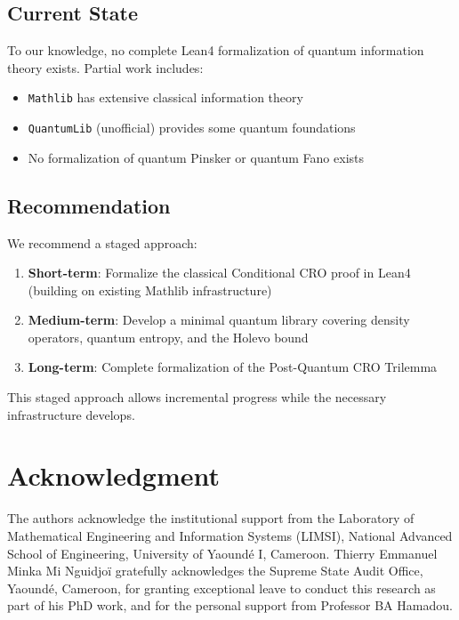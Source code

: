\documentclass{ieeeaccess}
\begin{document}
\subsection{Current State}

To our knowledge, no complete Lean4 formalization of quantum information theory exists. Partial work includes:
\begin{itemize}
    \item \texttt{Mathlib} has extensive classical information theory
    \item \texttt{QuantumLib} (unofficial) provides some quantum foundations
    \item No formalization of quantum Pinsker or quantum Fano exists
\end{itemize}

\subsection{Recommendation}

We recommend a staged approach:

\begin{enumerate}
    \item \textbf{Short-term}: Formalize the classical Conditional CRO proof in Lean4 (building on existing Mathlib infrastructure)

    \item \textbf{Medium-term}: Develop a minimal quantum library covering density operators, quantum entropy, and the Holevo bound

    \item \textbf{Long-term}: Complete formalization of the Post-Quantum CRO Trilemma
\end{enumerate}

This staged approach allows incremental progress while the necessary infrastructure develops.

\section*{Acknowledgment}

The authors acknowledge the institutional support from the Laboratory of Mathematical Engineering and Information Systems (LIMSI), National Advanced School of Engineering, University of Yaoundé I, Cameroon. 
Thierry Emmanuel Minka Mi Nguidjoï gratefully acknowledges the Supreme State Audit Office, Yaoundé, Cameroon, for granting exceptional leave to conduct this research as part of his PhD work, and for the personal support from Professor BA Hamadou.
\end{document}
